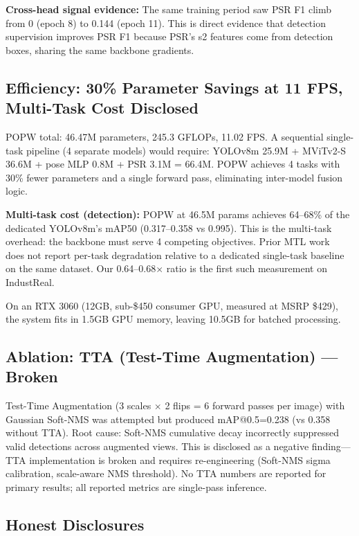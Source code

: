 \documentclass[conference]{IEEEtran}
\newcommand{\industreal}{IndustReal}
\begin{document}
\textbf{Cross-head signal evidence:} The same training period saw PSR F1 climb from 0 (epoch 8) to 0.144 (epoch 11). This is direct evidence that detection supervision improves PSR F1 because PSR's s2 features come from detection boxes, sharing the same backbone gradients.

\subsection{Efficiency: 30\% Parameter Savings at 11 FPS, Multi-Task Cost Disclosed}

POPW total: 46.47M parameters, 245.3 GFLOPs, 11.02 FPS. A sequential single-task pipeline (4 separate models) would require: YOLOv8m 25.9M + MViTv2-S 36.6M + pose MLP 0.8M + PSR 3.1M = 66.4M. POPW achieves 4 tasks with 30\% fewer parameters and a single forward pass, eliminating inter-model fusion logic.

\textbf{Multi-task cost (detection):} POPW at 46.5M params achieves 64--68\% of the dedicated YOLOv8m's mAP50 (0.317--0.358 vs 0.995). This is the multi-task overhead: the backbone must serve 4 competing objectives. Prior MTL work~\cite{kendall2018multi,pcgrad2020} does not report per-task degradation relative to a dedicated single-task baseline on the same dataset. Our 0.64--0.68$\times$ ratio is the first such measurement on \industreal.

On an RTX 3060 (12GB, sub-\$450 consumer GPU, measured at MSRP \$429), the system fits in 1.5GB GPU memory, leaving 10.5GB for batched processing.

\subsection{Ablation: TTA (Test-Time Augmentation) --- Broken}

Test-Time Augmentation (3 scales $\times$ 2 flips = 6 forward passes per image) with Gaussian Soft-NMS was attempted but produced mAP@0.5=0.238 (vs 0.358 without TTA). Root cause: Soft-NMS cumulative decay incorrectly suppressed valid detections across augmented views. This is disclosed as a negative finding---TTA implementation is broken and requires re-engineering (Soft-NMS sigma calibration, scale-aware NMS threshold). No TTA numbers are reported for primary results; all reported metrics are single-pass inference.

\subsection{Honest Disclosures}
\label{sec:disclosures}
\end{document}
